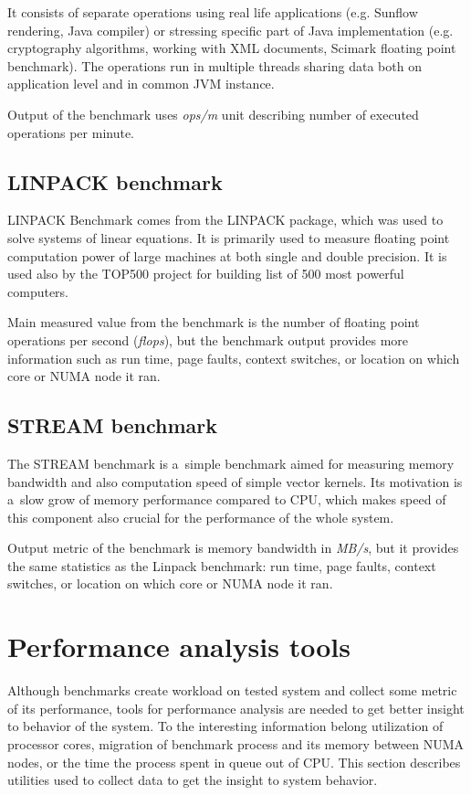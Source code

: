 It consists of separate operations using real life applications (e.g. Sunflow
rendering, Java compiler) or stressing specific part of Java implementation
(e.g. cryptography algorithms, working with XML documents, Scimark floating
point benchmark). The operations run in multiple threads sharing data both on
application level and in common JVM instance.

Output of the benchmark uses \emph{ops/m} unit describing number of executed
operations per minute.

\subsection{LINPACK benchmark}
LINPACK Benchmark\cite{linpack} comes from the LINPACK package, which was used to
solve systems of linear equations. It is primarily
used to measure floating point computation power of large machines at both
single and double precision. It is used also by the TOP500 project for building list
of 500 most powerful computers.

Main measured value from the benchmark is the number of floating point operations per
second (\emph{flops}), but the benchmark output provides more information such as
run time, page faults, context switches, or location on which core or NUMA node
it ran.

\subsection{STREAM benchmark}
The STREAM benchmark\;\cite{stream} is a~simple benchmark aimed for measuring memory
bandwidth and also computation speed of simple vector kernels. Its motivation is
a~slow grow of memory performance compared to CPU, which makes speed of this
component also crucial for the performance of the whole system.

Output metric of the benchmark is memory bandwidth in \emph{MB/s}, but it
provides the same statistics as the Linpack benchmark: run time, page faults,
context switches, or location on which core or NUMA node it ran.

\section{Performance analysis tools}
Although benchmarks create workload on tested system and collect some metric of
its performance, tools for performance analysis are needed to get better insight
to behavior of the system. To the interesting information belong utilization of
processor cores, migration of benchmark process and its memory between NUMA
nodes, or the time the process spent in queue out of CPU.
This section describes utilities used to collect data to get the insight to
system behavior.


